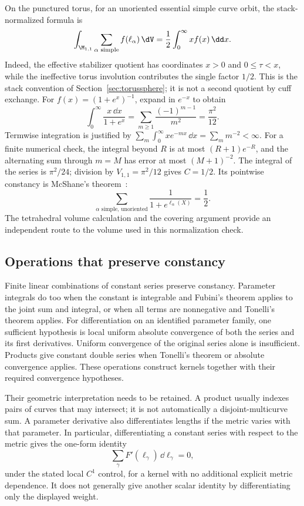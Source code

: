 On the punctured torus, for an unoriented essential simple curve orbit,
the stack-normalized formula is
\begin{equation}
 \int_{\M_{1,1}}\sum_{\alpha\text{ simple}}f(\ell_\alpha)\,\dV
       =\frac12\int_0^\infty x f(x)\,\dd x.
 \label{eq:torusunfold}
\end{equation}
Indeed, the effective stabilizer quotient has coordinates $x>0$ and
$0\leq\tau<x$, while the ineffective torus involution contributes the
single factor $1/2$. This is the stack convention of
Section~\ref{sec:torussphere}; it is not a second quotient by cuff exchange.
For $f(x)=(1+e^x)^{-1}$, expand in $e^{-x}$ to obtain
\[
 \int_0^\infty\frac{x\,\dd x}{1+e^x}
   =\sum_{m\ge1}\frac{(-1)^{m-1}}{m^2}=\frac{\pi^2}{12}.
\]
Termwise integration is justified by
$\sum_m\int_0^\infty xe^{-mx}\,\dd x=\sum_m m^{-2}<\infty$.
For a finite numerical check, the integral beyond $R$ is at most
$(R+1)e^{-R}$, and the alternating sum through $m=M$ has error at most
$(M+1)^{-2}$.
The integral of the series is $\pi^2/24$; division by
$V_{1,1}=\pi^2/12$ gives $C=1/2$. Its pointwise constancy is McShane's
theorem~\cite{McShane}:
\begin{equation}
 \sum_{\alpha\text{ simple, unoriented}}
                 \frac{1}{1+e^{\ell_\alpha(X)}}=\frac12.
 \label{eq:mcshane}
\end{equation}
The tetrahedral volume calculation and the covering argument provide an
independent route to the volume used in this normalization check.

\subsection{Operations that preserve constancy}

Finite linear combinations of constant series preserve constancy.
Parameter integrals do too when the constant is integrable and Fubini's
theorem applies to the joint sum and integral, or when all terms are
nonnegative and Tonelli's theorem applies. For differentiation on an
identified parameter family, one sufficient hypothesis is local uniform
absolute convergence of both the series and its first derivatives.
Uniform convergence of the original series alone is insufficient.
Products give constant double series when Tonelli's theorem or absolute
convergence applies. These operations construct kernels together with
their required convergence hypotheses.

Their geometric interpretation needs to be retained. A product usually
indexes pairs of curves that may intersect; it is not automatically a
disjoint-multicurve sum. A parameter derivative also differentiates lengths
if the metric varies with that parameter. In particular, differentiating
a constant series with respect to the metric gives the one-form identity
\begin{equation}
 \sum_\gamma F'(\ell_\gamma)\,\dd\ell_\gamma=0,
 \label{eq:derivativeidentity}
\end{equation}
under the stated local $C^1$ control, for a kernel with no additional
explicit metric dependence. It does not generally give
another scalar identity by differentiating only the displayed weight.

